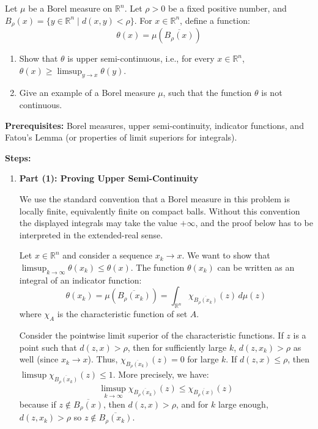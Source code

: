 \begin{exercise}
\label{analysis:2018:4}
Let $\mu$ be a Borel measure on $\mathbb{R}^n$. Let $\rho > 0$ be a fixed positive number, and $B_{\rho}(x) = \{y \in \mathbb{R}^n \mid d(x,y) < \rho\}$. For $x \in \mathbb{R}^n$, define a function:
\[
\theta(x) = \mu(\overline{B_{\rho}(x)})
\]
\begin{enumerate}
    \item Show that $\theta$ is upper semi-continuous, i.e., for every $x \in \mathbb{R}^n$, $\theta(x) \geq \limsup_{y \to x} \theta(y)$.
    \item Give an example of a Borel measure $\mu$, such that the function $\theta$ is not continuous.
\end{enumerate}
\end{exercise}

\begin{solution}
\textbf{Prerequisites:} 
Borel measures, upper semi-continuity, indicator functions, and Fatou's Lemma (or properties of limit superiors for integrals).

\par\vspace{\baselineskip}
\textbf{Steps:}

\begin{enumerate}
    \item \textbf{Part (1): Proving Upper Semi-Continuity}

    We use the standard convention that a Borel measure in this problem is locally finite, equivalently finite on compact balls.  Without this convention the displayed integrals may take the value $+\infty$, and the proof below has to be interpreted in the extended-real sense.

    Let $x \in \mathbb{R}^n$ and consider a sequence $x_k \to x$. We want to show that $\limsup_{k\to\infty} \theta(x_k) \leq \theta(x)$.
    The function $\theta(x_k)$ can be written as an integral of an indicator function:
    \[
    \theta(x_k) = \mu(\overline{B_\rho(x_k)}) = \int_{\mathbb{R}^n} \chi_{\overline{B_\rho(x_k)}}(z) \, d\mu(z)
    \]
    where $\chi_A$ is the characteristic function of set $A$.

    Consider the pointwise limit superior of the characteristic functions. If $z$ is a point such that $d(z, x) > \rho$, then for sufficiently large $k$, $d(z, x_k) > \rho$ as well (since $x_k \to x$). Thus, $\chi_{\overline{B_\rho(x_k)}}(z) = 0$ for large $k$. If $d(z, x) \leq \rho$, then $\limsup \chi_{\overline{B_\rho(x_k)}}(z) \leq 1$.
    More precisely, we have:
    \[
    \limsup_{k\to\infty} \chi_{\overline{B_\rho(x_k)}}(z) \leq \chi_{\overline{B_\rho(x)}}(z)
    \]
    because if $z \notin \overline{B_\rho(x)}$, then $d(z,x) > \rho$, and for $k$ large enough, $d(z, x_k) > \rho$ so $z \notin \overline{B_\rho(x_k)}$.


\end{enumerate}
\end{solution}
